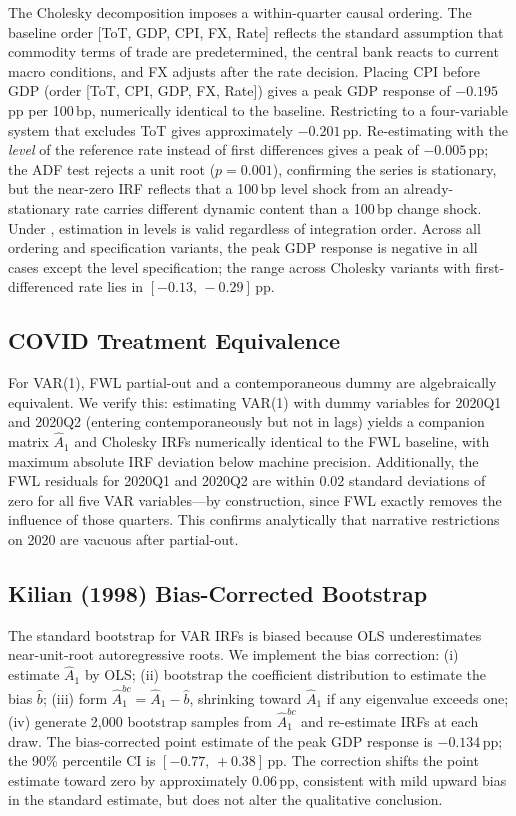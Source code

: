 \documentclass[12pt,letterpaper]{article}
\begin{document}
The Cholesky decomposition imposes a within-quarter causal ordering. The
baseline order [ToT, GDP, CPI, FX, Rate] reflects the standard assumption
that commodity terms of trade are predetermined, the central bank reacts
to current macro conditions, and FX adjusts after the rate decision.
Placing CPI before GDP (order [ToT, CPI, GDP, FX, Rate]) gives a peak GDP
response of $-0.195$\,pp per 100\,bp, numerically identical to the
baseline. Restricting to a four-variable system that excludes ToT gives
approximately $-0.201$\,pp. Re-estimating with the \textit{level} of the
reference rate instead of first differences gives a peak of $-0.005$\,pp;
the ADF test rejects a unit root ($p=0.001$), confirming the series is
stationary, but the near-zero IRF reflects that a 100\,bp level shock
from an already-stationary rate carries different dynamic content than a
100\,bp change shock. Under \citet{sims1990}, estimation in levels is
valid regardless of integration order. Across all ordering and
specification variants, the peak GDP response is negative in all cases
except the level specification; the range across Cholesky variants with
first-differenced rate lies in $[-0.13,\,-0.29]$\,pp.

\subsection{COVID Treatment Equivalence}
\label{app:rob:covid}

For VAR(1), FWL partial-out and a contemporaneous dummy are algebraically
equivalent. We verify this: estimating VAR(1) with dummy variables for
2020Q1 and 2020Q2 (entering contemporaneously but not in lags) yields a
companion matrix $\hat{A}_1$ and Cholesky IRFs numerically identical to
the FWL baseline, with maximum absolute IRF deviation below machine
precision. Additionally, the FWL residuals for 2020Q1 and 2020Q2 are
within 0.02 standard deviations of zero for all five VAR variables---by
construction, since FWL exactly removes the influence of those quarters.
This confirms analytically that narrative restrictions on 2020 are vacuous
after partial-out.

\subsection{Kilian (1998) Bias-Corrected Bootstrap}
\label{app:rob:kilian}

The standard bootstrap for VAR IRFs is biased because OLS underestimates
near-unit-root autoregressive roots. We implement the \citet{kilian1998}
bias correction: (i) estimate $\hat{A}_1$ by OLS; (ii) bootstrap the
coefficient distribution to estimate the bias $\hat{b}$; (iii) form
$\hat{A}_1^{bc}=\hat{A}_1-\hat{b}$, shrinking toward $\hat{A}_1$ if
any eigenvalue exceeds one; (iv) generate 2,000 bootstrap samples from
$\hat{A}_1^{bc}$ and re-estimate IRFs at each draw. The bias-corrected
point estimate of the peak GDP response is $-0.134$\,pp; the 90\%
percentile CI is $[-0.77,\,+0.38]$\,pp. The correction shifts the point
estimate toward zero by approximately 0.06\,pp, consistent with mild
upward bias in the standard estimate, but does not alter the qualitative
conclusion.
\end{document}
